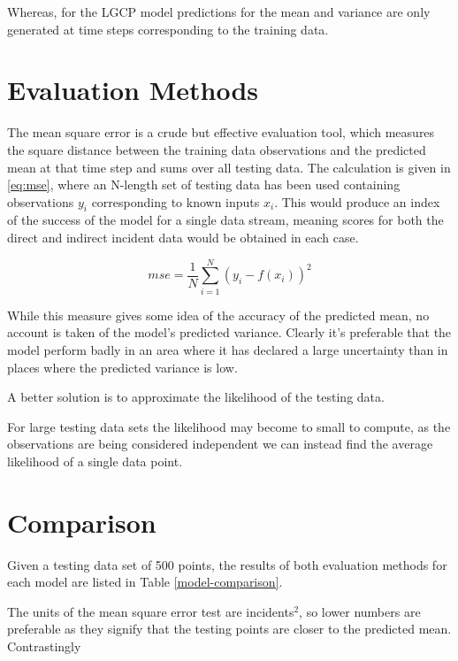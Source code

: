 \documentclass[a4paper,11pt]{report}
\begin{document}
Whereas, for the LGCP model predictions for the mean and variance are only generated at time steps corresponding to the training data. 


\section{Evaluation Methods}
The mean square error is a crude but effective evaluation tool, which measures the square distance between the training data observations and the predicted mean at that time step and sums over all testing data. The calculation is given in \ref{eq:mse}, where an N-length set of testing data has been used containing observations \(y_i\) corresponding to known inputs \(x_i\). This would produce an index of the success of the model for a single data stream, meaning scores for both the direct and indirect incident data would be obtained in each case. 

\begin{equation} \label{eq:mse}
mse = \frac{1}{N} \sum_{i=1}^{N} (y_i - f(x_i))^2
\end{equation}

While this measure gives some idea of the accuracy of the predicted mean, no account is taken of the model's predicted variance. Clearly it's preferable that the model perform badly in an area where it has declared a large uncertainty than in places where the predicted variance is low. \par


A better solution is to approximate the likelihood of the testing data. 

For large testing data sets the likelihood may become to small to compute, as the observations are being considered independent we can instead find the average likelihood of a single data point.

\section{Comparison}

Given a testing data set of 500 points, the results of both evaluation methods for each model are listed in Table \ref{model-comparison}. \par

The units of the mean square error test are incidents\(^2\), so lower numbers are preferable as they signify that the testing points are closer to the predicted mean. Contrastingly 
\end{document}

